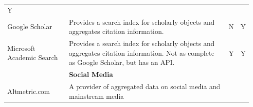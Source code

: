\documentclass[]{krantz}
\begin{document}
\begin{longtable}[]{@{}llcc@{}}
\begin{minipage}[t]{0.02\columnwidth}
Y\strut
\end{minipage}\tabularnewline
\begin{minipage}[t]{0.10\columnwidth}\raggedright\strut
Google Scholar\strut
\end{minipage} & \begin{minipage}[t]{0.74\columnwidth}\raggedright\strut
Provides a search index for scholarly objects and aggregates citation
information.\strut
\end{minipage} & \begin{minipage}[t]{0.02\columnwidth}\centering\strut
N\strut
\end{minipage} & \begin{minipage}[t]{0.02\columnwidth}\centering\strut
Y\strut
\end{minipage}\tabularnewline
\begin{minipage}[t]{0.10\columnwidth}\raggedright\strut
Microsoft Academic Search\strut
\end{minipage} & \begin{minipage}[t]{0.74\columnwidth}\raggedright\strut
Provides a search index for scholarly objects and aggregates citation
information. Not as complete as Google Scholar, but has an API.\strut
\end{minipage} & \begin{minipage}[t]{0.02\columnwidth}\centering\strut
Y\strut
\end{minipage} & \begin{minipage}[t]{0.02\columnwidth}\centering\strut
Y\strut
\end{minipage}\tabularnewline
\begin{minipage}[t]{0.10\columnwidth}\raggedright\strut
\strut
\end{minipage} & \begin{minipage}[t]{0.74\columnwidth}\raggedright\strut
\textbf{Social Media}\strut
\end{minipage} & \begin{minipage}[t]{0.02\columnwidth}\centering\strut
\strut
\end{minipage} & \begin{minipage}[t]{0.02\columnwidth}\centering\strut
\strut
\end{minipage}\tabularnewline
\begin{minipage}[t]{0.10\columnwidth}\raggedright\strut
Altmetric.com\strut
\end{minipage} & \begin{minipage}[t]{0.74\columnwidth}\raggedright\strut
A provider of aggregated data on social media and mainstream media

\end{minipage}
\end{longtable}
\end{document}
